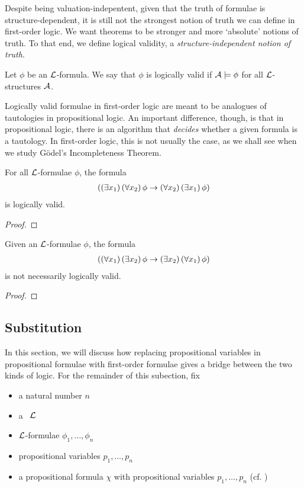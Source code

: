 Despite being valuation-indepentent, given that the truth of formulae is structure-dependent, it is still not the strongest notion of truth we can define in first-order logic. We want theorems to be stronger and more `absolute' notions of truth. To that end, we define logical validity, a \textit{structure-independent notion of truth}.

\begin{boxdefinition}\label{Ch2:Def:Logical_Validity}
    Let $\phi$ be an $\mathcal{L}$-formula. We say that $\phi$ is logically valid if $\mathcal{A} \models \phi$ for all $\mathcal{L}$-structures $\mathcal{A}$.
\end{boxdefinition}

Logically valid formulae in first-order logic are meant to be analogues of tautologies in propositional logic. An important difference, though, is that in propositional logic, there is an algorithm that \textit{decides} whether a given formula is a tautology. In first-order logic, this is not usually the case, as we shall see when we study Gödel's Incompleteness Theorem.

\begin{boxexample}
    For all $\mathcal{L}$-formulae $\phi$, the formula
    \begin{align*}
        \left( \left( \exists x_1 \right)\left( \forall x_2 \right)\phi \to \left( \forall x_2 \right)\left( \exists x_1 \right)\phi \right)
    \end{align*}
    is logically valid.
    \begin{proof}
        \sorry
    \end{proof}
\end{boxexample}

\begin{boxnexample}
    Given an $\mathcal{L}$-formulae $\phi$, the formula
    \begin{align*}
        \left( \left( \forall x_1 \right)\left( \exists x_2 \right)\phi \to \left( \exists x_2 \right)\left( \forall x_1 \right)\phi \right)
    \end{align*}
    is not necessarily logically valid.
    \begin{proof}
        \sorry
    \end{proof}
\end{boxnexample}

\subsection{Substitution}

In this section, we will discuss how replacing propositional variables in propositional formulae with first-order formulae gives a bridge between the two kinds of logic. For the remainder of this subection, fix
\begin{itemize}
    \item a natural number $n$
    \item a \fola\ $\mathcal{L}$
    \item $\mathcal{L}$-formulae $\phi_1, \ldots, \phi_n$
    \item propositional variables $p_1, \ldots, p_n$
    \item a propositional formula $\chi$ with propositional variables $p_1, \ldots, p_n$ (cf. )
\end{itemize}

